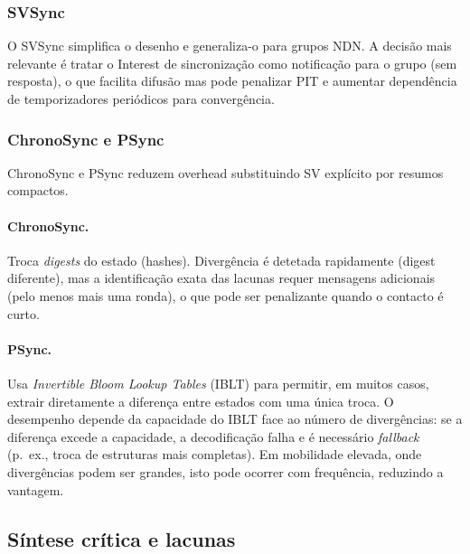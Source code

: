 \subsubsection{SVSync}
\label{subsub:svsync}

O \gls{SVSync} simplifica o desenho e generaliza-o para grupos \gls{NDN}. A decisão mais relevante é tratar o Interest de sincronização como notificação para o grupo (sem resposta), o que facilita difusão mas pode penalizar PIT e aumentar dependência de temporizadores periódicos para convergência.

\subsubsection{ChronoSync e PSync} 
\label{subsub:chronosync_psync} 

ChronoSync \cite{zhu_lets_2013} e PSync \cite{dragoi_psync_2016} reduzem overhead substituindo SV explícito por resumos compactos.

\paragraph{ChronoSync.}
Troca \textit{digests} do estado (hashes). Divergência é detetada rapidamente (digest diferente), mas a identificação exata das lacunas requer mensagens adicionais (pelo menos mais uma ronda), o que pode ser penalizante quando o contacto é curto.

\paragraph{PSync.}
Usa \textit{Invertible Bloom Lookup Tables} (IBLT) para permitir, em muitos casos, extrair diretamente a diferença entre estados com uma única troca. O desempenho depende da capacidade do IBLT face ao número de divergências: se a diferença excede a capacidade, a decodificação falha e é necessário \textit{fallback} (p.\ ex., troca de estruturas mais completas). Em mobilidade elevada, onde divergências podem ser grandes, isto pode ocorrer com frequência, reduzindo a vantagem.

\subsection{Síntese crítica e lacunas} 
\label{sec:critica} 

